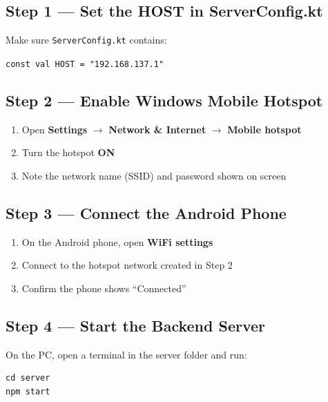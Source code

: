 \documentclass[12pt,a4paper]{article}
\begin{document}
\subsection{Step 1 --- Set the HOST in ServerConfig.kt}

Make sure \texttt{ServerConfig.kt} contains:

\begin{codebox}
\texttt{const val HOST = "192.168.137.1"}
\end{codebox}

\subsection{Step 2 --- Enable Windows Mobile Hotspot}

\begin{enumerate}[leftmargin=1.5cm]
  \item Open \textbf{Settings} $\rightarrow$ \textbf{Network \& Internet} $\rightarrow$
        \textbf{Mobile hotspot}
  \item Turn the hotspot \textbf{ON}
  \item Note the network name (SSID) and password shown on screen
\end{enumerate}

\subsection{Step 3 --- Connect the Android Phone}

\begin{enumerate}[leftmargin=1.5cm]
  \item On the Android phone, open \textbf{WiFi settings}
  \item Connect to the hotspot network created in Step 2
  \item Confirm the phone shows ``Connected''
\end{enumerate}

\subsection{Step 4 --- Start the Backend Server}

On the PC, open a terminal in the server folder and run:

\begin{codebox}
\begin{verbatim}
cd server
npm start
\end{verbatim}
\end{codebox}
\end{document}
